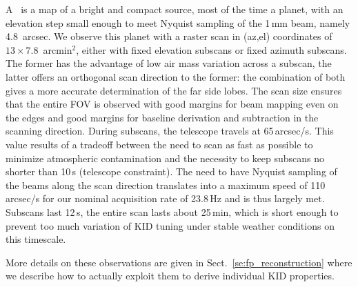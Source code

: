 A \bm\ is a map of a bright and compact source, most of the time a planet, with
an elevation step small enough to meet Nyquist sampling of the 1\,mm beam,
namely 4.8~arcsec. We observe this planet with a raster scan in (az,el)
coordinates of $13\times7.8$~arcmin$^2$, either with fixed elevation subscans or
fixed azimuth subscans. The former has the advantage of low air mass variation
across a subscan, the latter offers an orthogonal scan direction to the former:
the combination of both gives a more accurate determination of the far side
lobes. The scan size ensures that the entire FOV is observed with good margins
for beam mapping even on the edges and good margins for baseline derivation and
subtraction in the scanning direction. During subscans, the telescope travels at
65\,arcsec/s. This value results of a tradeoff between the need to scan as
fast as possible to minimize atmospheric contamination and the
necessity to keep subscans no shorter than 10\,s (telescope
constraint). The need to have Nyquist sampling of
the beams along the scan direction translates into a maximum speed of 110\,arcsec/s
for our nominal acquisition rate of 23.8\,Hz and is thus largely met. Subscans
last 12\,s, the entire scan lasts about 25\,min, which is short enough to prevent
too much variation of KID tuning under stable weather conditions on this
timescale.

More details on these observations are given in Sect.~\ref{se:fp_reconstruction}
where we describe how to actually exploit them to derive individual KID
properties.

